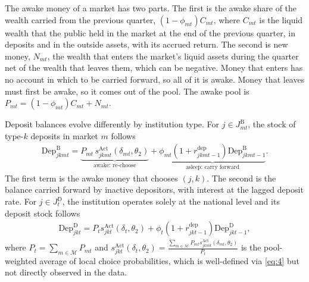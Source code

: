 The awake money of a market has two parts. The first is the awake share of the wealth carried from the previous quarter, $\left(1 - \phi_{mt}\right)C_{mt}$, where $C_{mt}$ is the liquid wealth that the public held in the market at the end of the previous quarter, in deposits and in the outside assets, with its accrued return. The second is new money, $N_{mt}$, the wealth that enters the market's liquid assets during the quarter net of the wealth that leaves them, which can be negative. Money that enters has no account in which to be carried forward, so all of it is awake. Money that leaves must first be awake, so it comes out of the pool. The awake pool is $P_{mt} = \left(1 - \phi_{mt}\right)C_{mt} + N_{mt}$. %

Deposit balances evolve differently by institution type. For $j \in J_{mt}^{\mathrm{B}}$, the stock of type-$k$ deposits in market $m$ follows %
\begin{gather}
	\mathrm{Dep}_{jkmt}^{\mathrm{B}} = \underset{\text{awake: re-choose}}{\underbrace{P_{mt}\,s_{jkmt}^{\mathrm{Act}}(\delta_{mt},\theta_2)}} + \underset{\text{asleep: carry forward}}{\underbrace{\phi_{mt}\left(1 + r_{jkmt-1}^{\mathrm{dep}}\right)\mathrm{Dep}_{jkmt-1}^{\mathrm{B}}}}.
	\label{eq:7-B} \tag{7-B}
\end{gather}
The first term is the awake money that chooses $(j,k)$. The second is the balance carried forward by inactive depositors, with interest at the lagged deposit rate. For $j \in J_t^{\mathrm{D}}$, the institution operates solely at the national level and its deposit stock follows %
\begin{gather}
	\mathrm{Dep}_{jkt}^{\mathrm{D}} = P_ts_{jkt}^{\mathrm{Act}}(\delta_t,\theta_2) + \phi_t\left(1 + r_{jkt-1}^{\mathrm{dep}}\right)\mathrm{Dep}_{jkt-1}^{\mathrm{D}},
	\label{eq:7-D} \tag{7-D}
\end{gather}
where $P_t = \sum_{m \in \mathcal{M}}{P_{mt}}$ and $s_{jkt}^{\mathrm{Act}}(\delta_t,\theta_2) = \frac{\sum_{m \in \mathcal{M}}{P_{mt}s_{jkmt}^{\mathrm{Act}}(\delta_{mt},\theta_2)}}{P_t}$ is the pool-weighted average of local choice probabilities, which is well-defined via \eqref{eq:4} but not directly observed in the data. %

